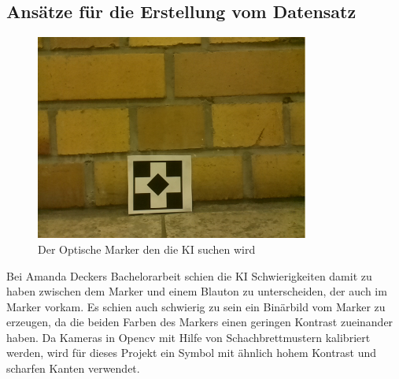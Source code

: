 \documentclass[conference]{IEEEtran}
\begin{document}
\subsection{Ansätze für die Erstellung vom Datensatz}	%
\begin{figure} %
	\centering
	\includegraphics[width=9cm]{img/data1455211246.png}
	\caption{Der Optische Marker den die KI suchen wird }
	\label{Marker}
\end{figure}

Bei Amanda Deckers Bachelorarbeit schien die KI Schwierigkeiten damit zu haben zwischen dem Marker und einem Blauton zu unterscheiden, der auch im Marker vorkam.
Es schien auch schwierig zu sein ein Binärbild vom Marker zu erzeugen, da die beiden Farben des Markers einen geringen Kontrast zueinander haben.
Da Kameras in Opencv mit Hilfe von Schachbrettmustern kalibriert werden, wird für dieses Projekt ein Symbol mit ähnlich hohem Kontrast und scharfen Kanten verwendet.
\\
\end{document}
